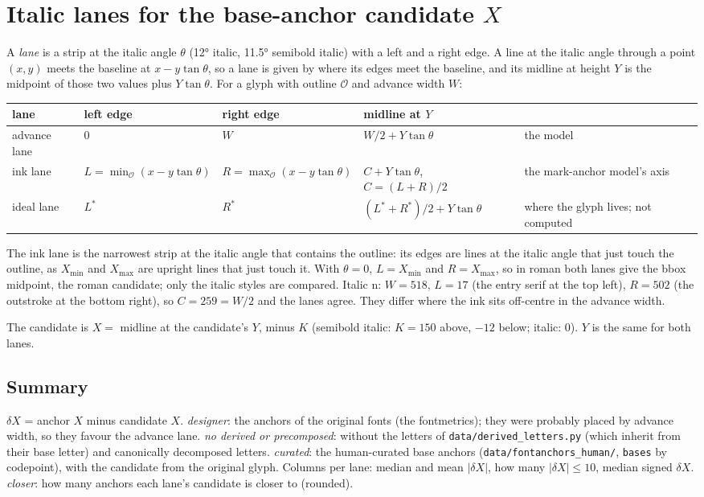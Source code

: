 \documentclass[landscape]{article}
\begin{document}
\section*{Italic lanes for the base-anchor candidate $X$}

A \emph{lane} is a strip at the italic angle $\theta$ (12° italic, 11.5° semibold italic) with a left and a right edge.
A line at the italic angle through a point $(x, y)$ meets the baseline at $x - y\tan\theta$,
so a lane is given by where its edges meet the baseline, and its midline at height $Y$ is
the midpoint of those two values plus $Y\tan\theta$.
For a glyph with outline $\mathcal{O}$ and advance width $W$:

\begin{tabular}{lllll}
lane & left edge & right edge & midline at $Y$ & \\
\hline
advance lane & $0$ & $W$ & $W/2 + Y\tan\theta$ & the model \\
ink lane & $L = \min_{\mathcal{O}} (x - y\tan\theta)$ & $R = \max_{\mathcal{O}} (x - y\tan\theta)$ & $C + Y\tan\theta$, \ $C = (L+R)/2$ & the mark-anchor model's axis \\
ideal lane & $L^*$ & $R^*$ & $(L^*+R^*)/2 + Y\tan\theta$ & where the glyph lives; not computed \\
\end{tabular}

The ink lane is the narrowest strip at the italic angle that contains the outline:
its edges are lines at the italic angle that just touch the outline, as $X_\mathrm{min}$ and $X_\mathrm{max}$ are upright lines that just touch it.
With $\theta = 0$, $L = X_\mathrm{min}$ and $R = X_\mathrm{max}$, so in roman both lanes give the bbox midpoint, the roman candidate; only the italic styles are compared.
Italic n: $W = 518$, $L = 17$ (the entry serif at the top left), $R = 502$ (the outstroke at the bottom right), so $C = 259 = W/2$ and the lanes agree.
They differ where the ink sits off-centre in the advance width.

The candidate is $X = $ midline at the candidate's $Y$, minus $K$ (semibold italic: $K = 150$ above, $-12$ below; italic: $0$).
$Y$ is the same for both lanes.

\subsection*{Summary}

$\delta X$ = anchor $X$ minus candidate $X$.
\emph{designer}: the anchors of the original fonts (the fontmetrics); they were probably placed by advance width, so they favour the advance lane.
\emph{no derived or precomposed}: without the letters of \verb|data/derived_letters.py| (which inherit from their base letter) and canonically decomposed letters.
\emph{curated}: the human-curated base anchors (\verb|data/fontanchors_human/|, \verb|bases| by codepoint), with the candidate from the original glyph.
Columns per lane: median and mean $|\delta X|$, how many $|\delta X| \le 10$, median signed $\delta X$.
\emph{closer}: how many anchors each lane's candidate is closer to (rounded).
\end{document}

